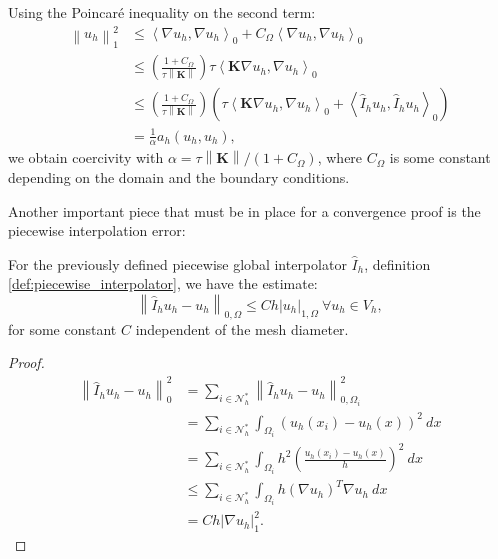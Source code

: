 \documentclass[../Main/main.tex]{subfiles}
\begin{document}
		Using the Poincaré inequality on the second term:
		\begin{equation}
		\begin{aligned} 
		\left \| u_h \right \|_1^2	&\leq \left \langle \nabla u_h,\nabla u_h \right \rangle_0 + C_{\Omega} \left \langle \nabla u_h, \nabla u_h \right \rangle_0 \\
			&\leq \left(\frac{1+C_{\Omega}}{\tau \left \|\bm{K}\right \|} \right) \tau \left  \langle  \bm{K} \nabla  u_h, \nabla u_h \right \rangle_0  \\
			&\leq \left(\frac{1+C_{\Omega}}{\tau \left \|\bm{K}\right \|} \right) \left(\tau \left  \langle  \bm{K} \nabla  u_h, \nabla u_h \right \rangle_0 + \left \langle \hat{I}_h u_h,\hat{I}_h u_h \right \rangle_0\right)\\
			&= \frac{1}{\alpha} a_h(u_h,u_h), 
		\end{aligned}
	\end{equation} 
	we obtain coercivity with $\alpha = \tau \left \|\bm{K}\right \|/(1+C_{\Omega})$, where $C_{\Omega}$ is some constant depending on the domain and the boundary conditions.\par
	Another important piece that must be in place for a convergence proof is the piecewise interpolation error:
	\begin{lemma}\label{lemma:int_error}
		For the previously defined piecewise global interpolator $\hat{I}_h$, definition \ref{def:piecewise_interpolator}, we have the estimate:
		\begin{equation}
			\left \| \hat{I}_h u_h - u_h \right \|_{0,\Omega} \leq C h | u_h |_{1,\Omega} \ \forall u_h \in V_h,
		\end{equation}
		for some constant $C$ independent of the mesh diameter.
	\end{lemma}
	\begin{proof}
		\begin{equation}
			\begin{aligned}
				\left \| \hat{I}_h u_h - u_h \right \|^2_0 &= \sum_{i\in \mathcal{N}_h^*} \left \|\hat{I}_h u_h - u_h\right \|^2_{0,\Omega_i} \\
					&=\sum_{i\in \mathcal{N}_h^*} \int_{\Omega_i}\left(u_h(x_i)-u_h(x)  \right)^2 \ dx\\
					&=\sum_{i\in \mathcal{N}_h^*} \int_{\Omega_i}h^2\left(\frac{u_h(x_i)-u_h(x)}{h}  \right)^2 \ dx\\
					&\leq \sum_{i\in \mathcal{N}_h^*} \int_{\Omega_i} h (\nabla u_h)^T \nabla u_h \ dx\\
					&=Ch|\nabla u_h|_1^2.
			\end{aligned}
		\end{equation}
	\end{proof}
\end{document}
